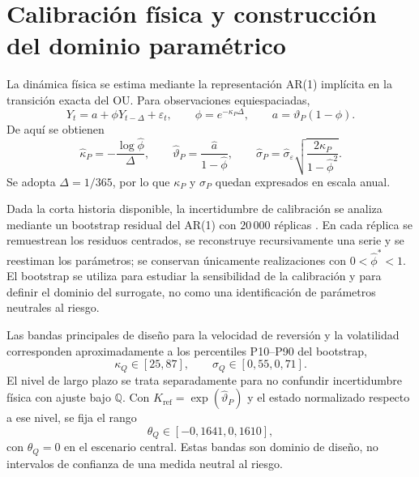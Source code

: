 \section{Calibración física y construcción del dominio paramétrico}
\label{sec:logou_calibration}

La dinámica física se estima mediante la representación AR(1) implícita en la
transición exacta del OU. Para observaciones equiespaciadas,
\begin{equation}
    Y_t=a+\phi Y_{t-\Delta}+\varepsilon_t,
    \qquad
    \phi=e^{-\kappa_P\Delta},
    \qquad
    a=\vartheta_P(1-\phi).
    \label{eq:ar1_logou}
\end{equation}
De aquí se obtienen
\begin{equation}
    \widehat\kappa_P=-\frac{\log\widehat\phi}{\Delta},\qquad
    \widehat\vartheta_P=\frac{\widehat a}{1-\widehat\phi},\qquad
    \widehat\sigma_P=\widehat\sigma_\varepsilon
    \sqrt{\frac{2\widehat\kappa_P}{1-\widehat\phi^2}}.
    \label{eq:ou_ar1_mapping}
\end{equation}
Se adopta $\Delta=1/365$, por lo que $\kappa_P$ y $\sigma_P$ quedan expresados
en escala anual.

Dada la corta historia disponible, la incertidumbre de calibración se analiza
mediante un bootstrap residual del AR(1) con $20\,000$ réplicas
\parencite{efron_tibshirani_1993}. En cada réplica se remuestrean los residuos
centrados, se reconstruye recursivamente una serie y se reestiman los parámetros;
se conservan únicamente realizaciones con $0<\widehat\phi^*<1$. El bootstrap se
utiliza para estudiar la sensibilidad de la calibración y para definir el dominio
del surrogate, no como una identificación de parámetros neutrales al riesgo.

Las bandas principales de diseño para la velocidad de reversión y la volatilidad
corresponden aproximadamente a los percentiles P10--P90 del bootstrap,
\begin{equation}
    \kappa_Q\in[25,87],\qquad \sigma_Q\in[0{,}55,0{,}71].
    \label{eq:kappa_design_band}
\end{equation}
El nivel de largo plazo se trata separadamente para no confundir incertidumbre
física con ajuste bajo $\mathbb Q$. Con
$K_{\mathrm{ref}}=\exp(\widehat\vartheta_P)$ y el estado normalizado respecto a
ese nivel, se fija el rango
\begin{equation}
    \theta_Q\in[-0{,}1641,0{,}1610],
    \label{eq:theta_design_band}
\end{equation}
con $\theta_Q=0$ en el escenario central. Estas bandas son dominio de diseño,
no intervalos de confianza de una medida neutral al riesgo.

